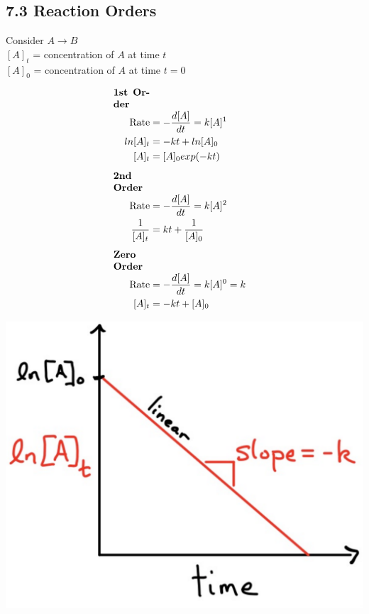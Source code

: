 \subsection{7.3 Reaction Orders}
\vspace*{0.5em}
Consider $A \longrightarrow B$\\
$[A]_t$ = concentration of $A$ at time $t$\\
$[A]_0$ = concentration of $A$ at time $t=0$

\begin{minipage}{0.99\linewidth}
    \begin{minipage}{0.65\linewidth}
        \begin{align*}
            \parbox{1.3cm}{\textbf{1st Order}}\\
            \text{Rate} &= -\frac{d[A]}{d t} = k[A]^1 \\
            ln[A]_t &= -k t + ln[A]_0\\
            [A]_t& = [A]_0 exp(-k t)
            \\[0.5em]
            \parbox{1.3cm}{\textbf{2nd Order}}\\
            \text{Rate} &= -\frac{d[A]}{d t} = k[A]^2 \\
            \frac{1}{[A]_t} &= k t + \frac{1}{[A]_0}
            \\[0.5em]
            \parbox{1.3cm}{\textbf{Zero Order}}\\
            \text{Rate} &= -\frac{d[A]}{d t} = k[A]^0 = k \\
            [A]_t &= -k t + [A]_0 \\
        \end{align*}
    \end{minipage}
    \begin{minipage}{0.34\linewidth}
        \includegraphics[width=0.9\linewidth]{src/7_Kinetics/images/1st_order.pdf}


\end{minipage}
\end{minipage}
